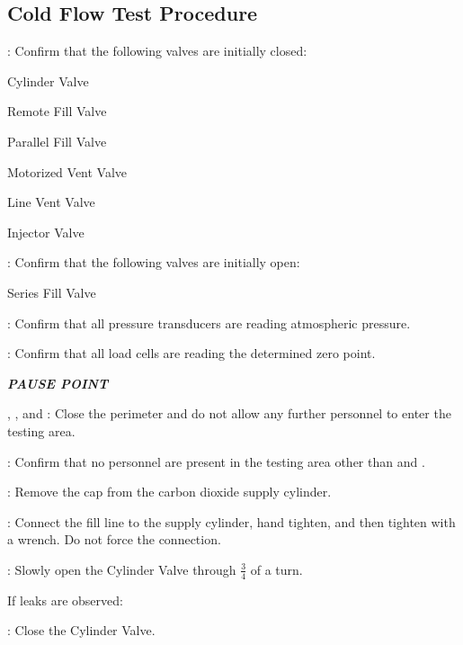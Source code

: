 \subsection{Cold Flow Test Procedure}
\begin{checklist}
    \item \primary{}: Confirm that the following valves are initially closed:
    \begin{checklist}
        \item Cylinder Valve
        \item Remote Fill Valve
        \item Parallel Fill Valve
        \item Motorized Vent Valve
        \item Line Vent Valve
        \item Injector Valve
    \end{checklist}
    \item \primary{}: Confirm that the following valves are initially open:
    \begin{checklist}
	\item Series Fill Valve
    \end{checklist}
    \item \daq{}: Confirm that all pressure transducers are reading atmospheric pressure.
    \item \daq{}: Confirm that all load cells are reading the determined zero point.
    \item \textbf{\textit{PAUSE POINT}}
    \item \peri{}, \perii{}, and \periii{}: Close the perimeter and do not allow any further personnel to enter the testing area.
    \item \secondary: Confirm that no personnel are present in the testing area other than \primary{} and \secondary.
    \item \primary{}: Remove the cap from the carbon dioxide supply cylinder.
    \item \primary{}: Connect the fill line to the supply cylinder, hand tighten, and then tighten with a wrench. Do not force the connection.
    \item \primary{}: Slowly open the Cylinder Valve through $\frac{3}{4}$  of a turn.
    \begin{checklist}[label=$\bullet$]
        \item If leaks are observed:
        \begin{checklist}
            \item \primary{}: Close the Cylinder Valve.

\end{checklist}
\end{checklist}
\end{checklist}
